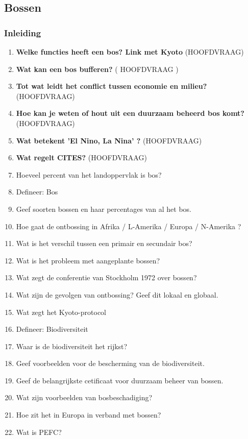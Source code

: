 \documentclass[12pt]{article}
\begin{document}
    \subsection{Bossen}
    \subsubsection*{Inleiding}
    \begin{enumerate}
        \item \textbf{Welke functies heeft een bos? Link met Kyoto} (HOOFDVRAAG)
        \item \textbf{Wat kan een bos bufferen?} ( HOOFDVRAAG )
        \item \textbf{Tot wat leidt het conflict tussen economie en milieu?} (HOOFDVRAAG)
        \item \textbf{Hoe kan je weten of hout uit een duurzaam beheerd bos komt?} (HOOFDVRAAG)
        \item \textbf{Wat betekent 'El Nino, La Nina' ?} (HOOFDVRAAG)
        \item \textbf{Wat regelt CITES?} (HOOFDVRAAG)
        \item Hoeveel percent van het landoppervlak is bos?
        \item Defineer: Bos
        \item Geef soorten bossen en haar percentages van al het bos.
        \item Hoe gaat de ontbossing in Afrika / L-Amerika / Europa / N-Amerika ?
        \item Wat is het verschil tussen een primair en secundair bos?
        \item Wat is het probleem met aangeplante bossen?
        \item Wat zegt de conferentie van Stockholm 1972 over bossen?
        \item Wat zijn de gevolgen van ontbossing? Geef dit lokaal en globaal.
        \item Wat zegt het Kyoto-protocol
        \item Defineer: Biodiversiteit
        \item Waar is de biodiversiteit het rijkst?
        \item Geef voorbeelden voor de bescherming van de biodiversiteit.
        \item Geef de belangrijkste cetificaat voor duurzaam beheer van bossen.
        \item Wat zijn voorbeelden van bosbeschadiging?
        \item Hoe zit het in Europa in verband met bossen?
        \item Wat is PEFC?
    \end{enumerate}
\end{document}
